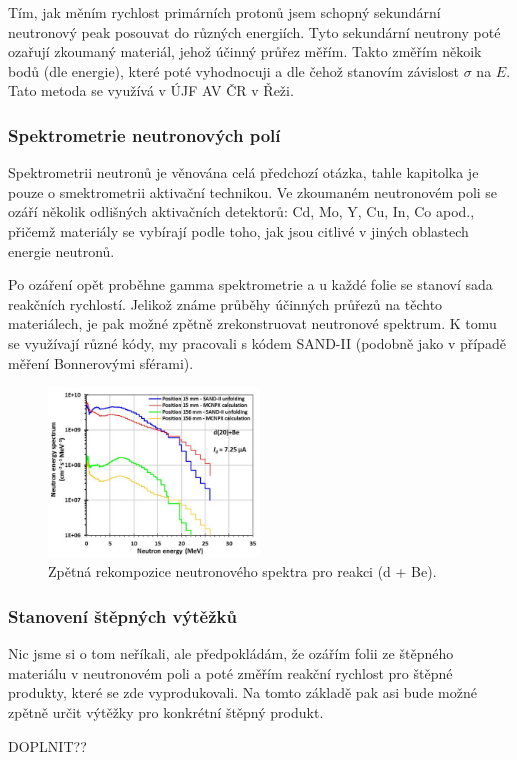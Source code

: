 Tím, jak měním rychlost primárních protonů jsem schopný sekundární neutronový peak posouvat do různých energiích. Tyto sekundární neutrony poté ozařují zkoumaný materiál, jehož účinný průřez měřím. Takto změřím někoik bodů (dle energie), které poté vyhodnocuji a dle čehož stanovím závislost $\sigma$ na $E$. Tato metoda se využívá v ÚJF AV ČR v Řeži.

\subsubsection{Spektrometrie neutronových polí}

Spektrometrii neutronů je věnována celá předchozí otázka, tahle kapitolka je pouze o smektrometrii aktivační technikou. Ve zkoumaném neutronovém poli se ozáří několik odlišných aktivačních detektorů: Cd, Mo, Y, Cu, In, Co apod., přičemž materiály se vybírají podle toho, jak jsou citlivé v jiných oblastech energie neutronů.

Po ozáření opět proběhne gamma spektrometrie a u každé folie se stanoví sada reakčních rychlostí. Jelikož známe průběhy účinných průřezů na těchto materiálech, je pak možné zpětně zrekonstruovat neutronové spektrum. K tomu se využívají různé kódy, my pracovali s kódem SAND-II (podobně jako v případě měření Bonnerovými sférami).

\begin{figure}[H]
    \centering
    \includegraphics[width=0.5\textwidth]{img/spektrum_aktivacne.JPG}
    \caption{Zpětná rekompozice neutronového spektra pro reakci (d + Be).}
\end{figure}

\subsubsection{Stanovení štěpných výtěžků}

Nic jsme si o tom neříkali, ale předpokládám, že ozářím folii ze štěpného materiálu v neutronovém poli a poté změřím reakční rychlost pro štěpné produkty, které se zde vyprodukovali. Na tomto základě pak asi bude možné zpětně určit výtěžky pro konkrétní štěpný produkt.

DOPLNIT??